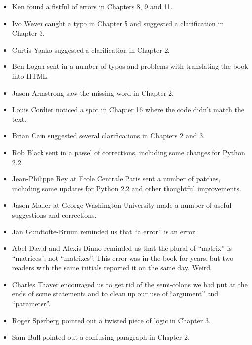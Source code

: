 \begin{itemize}
\item Ken found a fistful of errors in Chapters 8, 9 and 11.

\item Ivo Wever caught a typo in Chapter 5 and suggested a clarification
in Chapter 3.

\item Curtis Yanko suggested a clarification in Chapter 2.

\item Ben Logan sent in a number of typos and problems with translating
the book into HTML.

\item Jason Armstrong saw the missing word in Chapter 2.

\item Louis Cordier noticed a spot in Chapter 16 where the code
didn't match the text.

\item Brian Cain suggested several clarifications in Chapters 2 and 3.

\item Rob Black sent in a passel of corrections, including some
changes for Python 2.2.

\item Jean-Philippe Rey at Ecole Centrale
Paris sent a number of patches, including some updates for Python 2.2
and other thoughtful improvements.

\item Jason Mader at George Washington University made a number
of useful suggestions and corrections.

\item Jan Gundtofte-Bruun reminded us that ``a error'' is an error.

\item Abel David and Alexis Dinno reminded us that the plural of
``matrix'' is ``matrices'', not ``matrixes''.  This error was in the
book for years, but two readers with the same initials reported it on
the same day.  Weird.

\item Charles Thayer encouraged us to get rid of the semi-colons
we had put at the ends of some statements and to clean up our
use of ``argument'' and ``parameter''.

\item Roger Sperberg pointed out a twisted piece of logic in Chapter 3.

\item Sam Bull pointed out a confusing paragraph in Chapter 2.


\end{itemize}
